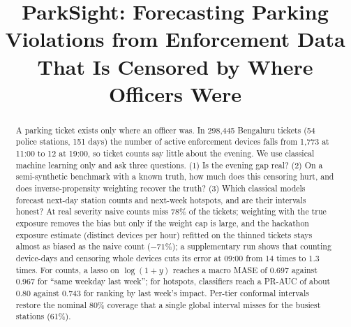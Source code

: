 \documentclass[conference]{IEEEtran}
\begin{document}
\title{ParkSight: Forecasting Parking Violations from Enforcement Data That Is Censored by Where Officers Were}

\author{
\and
{}
\and
{}
\and
{}
}

\maketitle

\begin{abstract}
A parking ticket exists only where an officer was. In 298{,}445 Bengaluru tickets (54 police stations, 151 days) the number of active enforcement devices falls from 1{,}773 at 11:00 to 12 at 19:00, so ticket counts say little about the evening. We use classical machine learning only and ask three questions. (1) Is the evening gap real? (2) On a semi-synthetic benchmark with a known truth, how much does this censoring hurt, and does inverse-propensity weighting recover the truth? (3) Which classical models forecast next-day station counts and next-week hotspots, and are their intervals honest? At real severity naive counts miss 78\% of the tickets; weighting with the true exposure removes the bias but only if the weight cap is large, and the hackathon exposure estimate (distinct devices per hour) refitted on the thinned tickets stays almost as biased as the naive count (\(-71\%\)); a supplementary run shows that counting device-days and censoring whole devices cuts its error at 09:00 from 14 times to 1.3 times. For counts, a lasso on \(\log(1{+}y)\) reaches a macro MASE of 0.697 against 0.967 for ``same weekday last week''; for hotspots, classifiers reach a PR-AUC of about 0.80 against 0.743 for ranking by last week's impact. Per-tier conformal intervals restore the nominal 80\% coverage that a single global interval misses for the busiest stations (61\%).
\end{abstract}
\end{document}
